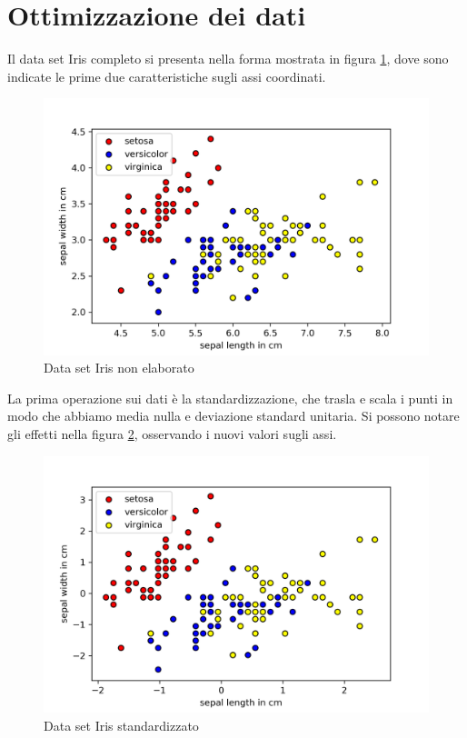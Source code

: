\section{Ottimizzazione dei dati}

Il data set Iris completo si presenta nella forma mostrata in figura 
\ref{fig:iris_grezzi}, dove sono indicate le prime due caratteristiche 
sugli assi coordinati. 

\begin{figure}[ht]
    \centering
    \includegraphics[width=\linewidth]{gfx/iris/irisfeatures}
    \caption{Data set Iris non elaborato}
    \label{fig:iris_grezzi}
\end{figure}

La prima operazione sui dati è la standardizzazione, che trasla e scala 
i punti in modo che abbiamo media nulla e deviazione standard unitaria. 
Si possono notare gli effetti nella figura \ref{fig:iris_standard}, 
osservando i nuovi valori sugli assi. 

\begin{figure}[h!]
    \centering
    \includegraphics[width=\linewidth]{gfx/iris/irisscaled}
    \caption{Data set Iris standardizzato}
    \label{fig:iris_standard}
\end{figure}

